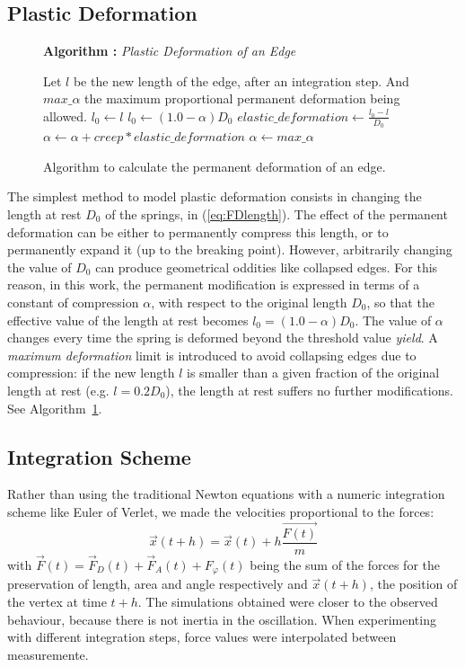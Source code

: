 \documentclass[journal]{IEEEtran}
\newcommand{\eref}[1]{(\ref{#1})}
\newcommand{\alref}[1]{Algorithm~\ref{#1}}
\newcounter{algorithm}
\newenvironment{algorithmicieee}[1]
  {\refstepcounter{algorithm}
   \begin{lrbox}{\ieeealgbox}
   \begin{minipage}{\dimexpr\columnwidth-2\fboxsep-2\fboxrule}
   \textbf{Algorithm \arabic{algorithm}:} \textit{#1} \par
   \begin{algorithmic}[1]}
  {\end{algorithmic}
   \end{minipage}
   \end{lrbox}\noindent\fbox{\usebox{\ieeealgbox}}}
\begin{document}
\subsection{Plastic Deformation}
\begin{figure}
 \begin{algorithmicieee}{Plastic Deformation of an Edge}\label{alg:deformEdge}
 \STATE Let $l$ be the new length of the edge, after an integration step. And $max\_\alpha$ the maximum proportional permanent deformation being allowed.
  \STATE $l_0 \gets l$
 \ELSE
  \STATE $l_0 \gets (1.0 - \alpha) D_0$
 \ENDIF
 \STATE $elastic\_deformation \gets \frac{l_0 - l}{D_0}$
  \STATE $\alpha \gets \alpha + creep * elastic\_deformation$
   \STATE $\alpha \gets max\_\alpha$
  \ENDIF
 \ENDIF
 \end{algorithmicieee}
\caption{Algorithm to calculate the permanent deformation of an edge.}
\end{figure}

The simplest method to model plastic deformation consists in changing the length at rest $D_0$ of the springs, in \eref{eq:FDlength}.  The effect of the permanent deformation can be either to permanently compress this length, or to permanently expand it (up to the breaking point).  However, arbitrarily changing the value of $D_0$ can produce geometrical oddities like collapsed edges.  For this reason, in this work, the permanent modification is expressed in terms of a constant of compression $\alpha$, with respect to the original length $D_0$, so that the effective value of the length at rest becomes $l_0 = (1.0 - \alpha) D_0$.  The value of $\alpha$ changes every time the spring is deformed beyond the threshold value \textit{yield}.  A \textit{maximum deformation} limit is introduced to avoid collapsing edges due to compression: if the new length $l$ is smaller than a given fraction of the original length at rest (e.g. $l=0.2 D_0$), the length at rest suffers no further modifications.  See \alref{alg:deformEdge}.

\subsection{Integration Scheme}
\label{sec:ischeme}
Rather than using the traditional Newton equations with a numeric integration scheme like Euler of Verlet, we made the velocities proportional to the forces:
\begin{equation}
 \vec{x}(t+h) = \vec{x}(t) + h \dfrac{\vec{F(t)}}{m}\label{eq:integration}
\end{equation}
with $\vec{F}(t) = \vec{F}_D(t) + \vec{F}_A(t) + F_\varphi(t)$ being the sum of the forces for the preservation of length, area and angle respectively and $\vec{x}(t+h)$, the position of the vertex at time $t+h$.  The simulations obtained were closer to the observed behaviour, because there is not inertia in the oscillation.
When experimenting with different integration steps, force values were interpolated between measuremente.
\end{document}
